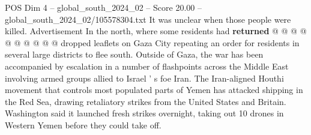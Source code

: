 \begin{textsample}{POS Dim 4 – global\_south\_2024\_02 – Score 20.00 – global\_south\_2024\_02/105578304.txt}
It was unclear when those people were killed.
Advertisement In the north, where some residents had \textbf{returned} @ @ @ @ @ @ @ @ @ @ dropped leaflets on Gaza City repeating an order for residents in several large districts to flee south.
Outside of Gaza, the war has been accompanied by escalation in a number of flashpoints across the Middle East involving armed groups allied to Israel ' s foe Iran.
The Iran-aligned Houthi movement that controls most populated parts of Yemen has attacked shipping in the Red Sea, drawing retaliatory strikes from the United States and Britain.
Washington said it launched fresh strikes overnight, taking out 10 drones in Western Yemen before they could take off.

\end{textsample}
